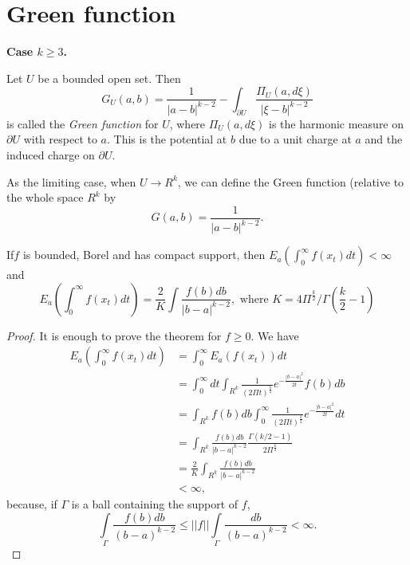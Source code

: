 \section{Green function}\label{chap3-sec5}%

\noindent
\textbf{Case {\boldmath$k \geq 3$.}}

\begin{defi*}
  Let $U$ be a bounded open set. Then
  $$
  G_U(a,b) = \frac{1}{| a-b|^{k-2}} - \int_{\partial U} \frac{\Pi_U
    (a, d \xi)}{| \xi - b|^{k-2}} 
  $$
  is called the {\em Green function} for $U$, where $\Pi_U (a, d \xi)$
  is the harmonic measure on $\partial U$ with respect to $a$. This is
  the potential at $b$ due to a unit charge at $a$ and the induced
  charge on $\partial U$. 
\end{defi*}

As the limiting case, when $U \to R^k$, we can define the Green
function (relative to the whole space $R^k$ by 
$$
G(a, b) = \frac{1}{|a-b |^{k-2}}.
$$

\setcounter{thm}{0}
\begin{thm}\label{chap3-sec5-thm1}%
If\pageoriginale $f$ is bounded, Borel and has compact support, then $E_a (
  \int^\infty_0 f(x_t)dt) < \infty$ and 
  $$
  E_a (\int^\infty_0 f(x_t) dt) = \frac{2}{K} \int \frac{f(b)
    db}{|b-a|^{k-2}}, \text{ where } K= 4 \Pi^{\frac{k}{2}}/\Gamma
  (\frac{k}{2}-1) 
  $$
\end{thm}

\begin{proof}
  It is enough to prove the theorem for $f \geq 0$. We have 
  \begin{align*}
    E_a \left( \int^\infty_0 f(x_t)dt\right) & = \int^\infty_0 E_a (f(x_t)) dt \\
    & = \int^\infty_0 dt \int_{R^k} \frac{1}{(2 \Pi
      t)^{\frac{k}{2}}}e^{- \frac{|b-a|^2}{2t}} f(b) db \\ 
    & = \int_{R^k} f(b) db \int^\infty_0 \frac{1}{(2 \Pi
      t)^{\frac{k}{2}}} e^{- \frac{|b-a|^2}{2t}} dt \\ 
    & = \int_{R^k}\frac{f(b) db}{|b-a|^{k-2}}\frac{\Gamma(k/2-1)}{2
      \Pi^{\frac{k}{2}}}\\ 
    & = \frac{2}{K} \int_{R^k} \frac{f(b) db}{|b-a|^{k-2}} \\
    & < \infty,
  \end{align*}
  because, if $\Gamma$ is a ball containing the support of $f$,
  $$
  \int\limits_\Gamma \frac{f(b)db}{(b-a)^{k-2}} \leq ||f|| 
\int\limits_\Gamma \frac{db}{(b-a)^{k-2}} <\infty.
  $$
\end{proof}

